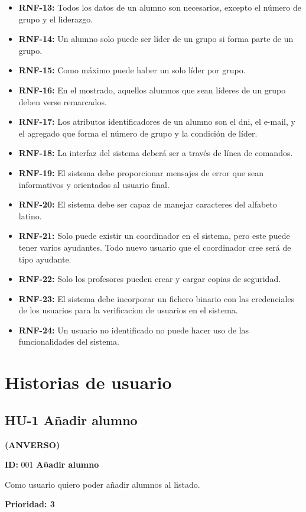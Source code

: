 \begin{itemize}
	\item \textbf{RNF-13:} Todos los datos de un alumno son necesarios, excepto el número de grupo y el liderazgo.
	\item \textbf{RNF-14:} Un alumno solo puede ser líder de un grupo si forma parte de un grupo.
	\item \textbf{RNF-15:} Como máximo puede haber un solo líder por grupo.
	\item \textbf{RNF-16:} En el mostrado, aquellos alumnos que sean líderes de un grupo deben verse remarcados.
	\item \textbf{RNF-17:} Los atributos identificadores de un alumno son el dni, el e-mail, y el agregado que forma el número de grupo y la condición de líder.
	\item \textbf{RNF-18:} La interfaz del sistema deberá ser a través de línea de comandos.
	\item \textbf{RNF-19:} El sistema debe proporcionar mensajes de error que sean informativos y orientados al usuario final.
	\item \textbf{RNF-20:} El sistema debe ser capaz de manejar caracteres del alfabeto latino.
	\item \textbf{RNF-21:} Solo puede existir un coordinador en el sistema, pero este puede tener varios ayudantes. Todo nuevo usuario que el coordinador cree será de tipo ayudante.
	\item \textbf{RNF-22:} Solo los profesores pueden crear y cargar copias de seguridad.
	\item \textbf{RNF-23:} El sistema debe incorporar un fichero binario con las credenciales de los usuarios para la verificacion de usuarios en el sistema.
	\item \textbf{RNF-24:} Un usuario no identificado no puede hacer uso de las funcionalidades del sistema.
\end{itemize}

\section{Historias de usuario}
\subsection{HU-1 Añadir alumno}
\textbf{(ANVERSO)}

\textbf{ID:} 001 \textbf{Añadir alumno}

Como usuario quiero poder añadir alumnos al listado. 

\textbf{Prioridad: 3}


